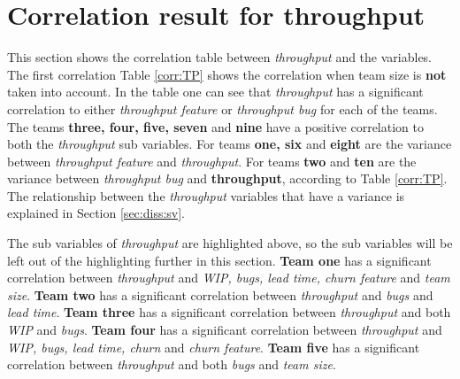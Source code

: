 \documentclass[UKenglish]{ifimaster}  %
\begin{document}
\section {Correlation result for throughput}
\label{sec:corr:TP}
This section shows the correlation table between \textit{throughput} and the variables. The first correlation Table \ref{corr:TP} shows the correlation when team size is \textbf{not} taken into account. In the table one can see that \textit{throughput} has a significant correlation to either \textit{throughput feature} or \textit{throughput bug} for each of the teams. The teams \textbf{three, four, five, seven} and \textbf{nine} have a positive correlation to both the \textit{throughput} sub variables. For teams \textbf{one, six} and \textbf{eight} are the variance between \textit{throughput feature} and \textit{throughput}.  For teams \textbf{two} and \textbf{ten} are the variance between \textit{throughput bug} and \textbf{throughput}, according to Table \ref{corr:TP}. The relationship between the \textit{throughput} variables that have a variance is explained in Section \ref{sec:diss:sv}.

The sub variables of \textit{throughput} are highlighted above, so the sub variables will be left out of the highlighting further  in this section.
\textbf{Team one} has a significant correlation between \textit{throughput} and \textit{WIP, bugs, lead time, churn feature} and \textit{team size}. \textbf{Team two} has a significant correlation between \textit{throughput} and \textit{bugs} and \textit{lead time}. \textbf{Team three} has a significant correlation between \textit{throughput} and both \textit{WIP} and \textit{bugs}. \textbf{Team four} has a significant correlation between \textit{throughput} and \textit{WIP, bugs, lead time, churn} and \textit{churn feature}.  \textbf{Team five} has a significant correlation between \textit{throughput} and both \textit{bugs} and \textit{team size}.
\end{document}
